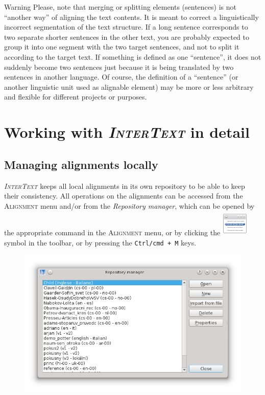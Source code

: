 \documentclass[a4paper,10pt,oneside]{book}
\newcommand{\IT}{\textit{\textsc{InterText}}\xspace}
\newcommand{\keys}[1]{\texttt{#1}}
\newcommand{\menu}[1]{\textsc{#1}}
\begin{document}
\medskip
\begin{bclogo}[couleur = blue!30, arrondi = 0.1, logo = \bcattention,
ombre = true , epOmbre = 0.125, couleurOmbre = black!30, blur, epBord = 0.3, marge = 5]{Warning}\small
Please, note that merging or splitting elements (sentences) is not ``another way'' of aligning the text contents. It is meant to correct a linguistically incorrect segmentation of the text structure. If a long sentence corresponds to two separate shorter sentences in the other text, you are probably expected to group it into one segment with the two target sentences, and not to split it according to the target text. If something is defined as one ``sentence'', it does not suddenly become two sentences just because it is being translated by two sentences in another language. Of course, the definition of a ``sentence'' (or another linguistic unit used as alignable element) may be more or less arbitrary and flexible for different projects or purposes.
\end{bclogo}

\part{Working with \IT in detail}\label{p:detail}

\chapter{Managing alignments locally}\label{ch:detail:managing_local}

\IT keeps all local alignments in its own repository to be able to keep their consistency. All operations on the alignments can be accessed from the \menu{Alignment} menu and/or from the \emph{Repository manager}, which can be opened by the appropriate command in the \menu{Alignment} menu, or by clicking the \includegraphics[height=2ex]{../images/48/manager.png} symbol in the toolbar, or by pressing the \keys{Ctrl/cmd + M} keys.

\begin{figure}[htb]
 \includegraphics[width=\textwidth]{screenshots/rep_manager.png}
\end{figure}
\end{document}

